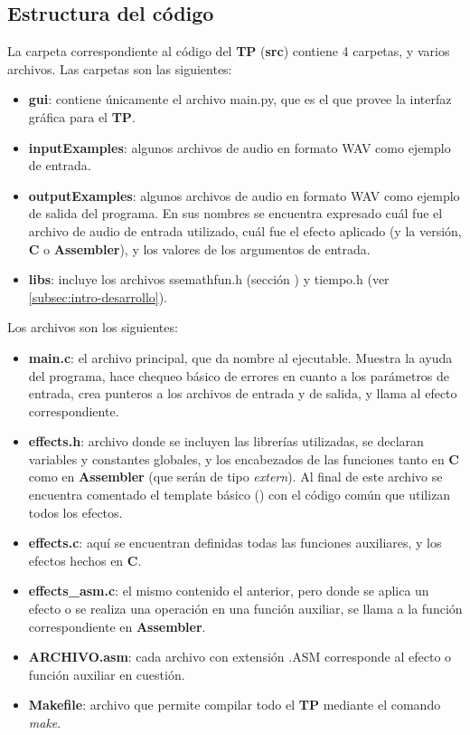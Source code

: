 \subsection{Estructura del código}
\label{subsec:desarrollo-estructura}
La carpeta correspondiente al código del \textbf{TP} (\textbf{src}) contiene 4 carpetas, y varios archivos. Las carpetas son las siguientes:
\begin{itemize}
  \item \textbf{gui}: contiene únicamente el archivo main.py, que es el que provee la interfaz gráfica para el \textbf{TP}.
  \item \textbf{inputExamples}: algunos archivos de audio en formato WAV como ejemplo de entrada.
  \item \textbf{outputExamples}: algunos archivos de audio en formato WAV como ejemplo de salida del programa. En sus nombres se encuentra expresado cuál fue el archivo de audio de entrada utilizado, cuál fue el efecto aplicado (y la versión, \textbf{C} o \textbf{Assembler}), y los valores de los argumentos de entrada.
  \item \textbf{libs}: incluye los archivos ssemathfun.h (sección ) y tiempo.h (ver \ref{subsec:intro-desarrollo}).
\end{itemize}

Los archivos son los siguientes:

\begin{itemize}
 \item \textbf{main.c}: el archivo principal, que da nombre al ejecutable. Muestra la ayuda del programa, hace chequeo básico de errores en cuanto a los parámetros de entrada, crea punteros a los archivos de entrada y de salida, y llama al efecto correspondiente.
 \item \textbf{effects.h}: archivo donde se incluyen las librerías utilizadas, se declaran variables y constantes globales, y los encabezados de las funciones tanto en \textbf{C} como en \textbf{Assembler} (que serán de tipo \textit{extern}). Al final de este archivo se encuentra comentado el template básico () con el código común que utilizan todos los efectos.
 \item \textbf{effects.c}: aquí se encuentran definidas todas las funciones auxiliares, y los efectos hechos en \textbf{C}.
 \item \textbf{effects\_asm.c}: el mismo contenido el anterior, pero donde se aplica un efecto o se realiza una operación en una función auxiliar, se llama a la función correspondiente en \textbf{Assembler}.
 \item \textbf{ARCHIVO.asm}: cada archivo con extensión .ASM corresponde al efecto o función auxiliar en cuestión.
 \item \textbf{Makefile}: archivo que permite compilar todo el \textbf{TP} mediante el comando \textit{make}.
\end{itemize}

